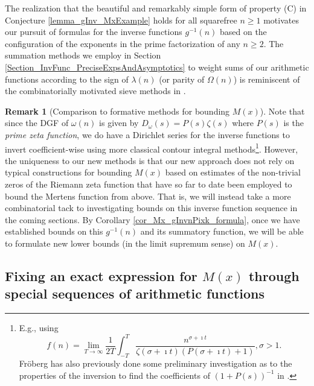 \documentclass[11pt,reqno,a4letter]{article}
\numberwithin{figure}{section}
\numberwithin{table}{section}
\theoremstyle{plain}
\numberwithin{theorem}{section}
\theoremstyle{definition}
\newtheorem{remark}[theorem]{Remark}
\begin{document}
The realization that the beautiful and remarkably simple form of property (C) 
in Conjecture \ref{lemma_gInv_MxExample} holds for all squarefree $n \geq 1$ 
motivates our pursuit of formulas for the inverse functions $g^{-1}(n)$ based on the configuration of the 
exponents in the prime factorization of any $n \geq 2$. 
The summation methods we employ in Section \ref{Section_InvFunc_PreciseExpsAndAsymptotics} 
to weight sums of our arithmetic functions according to the sign of 
$\lambda(n)$ (or parity of $\Omega(n)$) is reminiscent of the combinatorially motivated sieve methods in 
\cite[\S 17]{OPERADECRIBERO}. 

\begin{remark}[Comparison to formative methods for bounding $M(x)$]
Note that since the DGF of $\omega(n)$ is given by 
$D_{\omega}(s) = P(s) \zeta(s)$ where $P(s)$ is the \emph{prime zeta function}, we do have a 
Dirichlet series for the inverse functions to invert coefficient-wise using more classical 
contour integral methods\footnote{
E.g., using \cite[\S 11]{APOSTOLANUMT} 
\[
f(n) = \lim_{T \rightarrow \infty} \frac{1}{2T} \int_{-T}^{T} 
     \frac{n^{\sigma+\imath t}}{\zeta(\sigma+\imath t)(P(\sigma+\imath t) + 1)}, \sigma > 1. 
\]
Fr\"oberg has also previously done some preliminary investigation as to the properties of the 
inversion to find the coefficients of $(1+P(s))^{-1}$ in \cite{FROBERG-1968}. 
}. 
However, the uniqueness to our new methods is that our new approach does not rely on typical constructions for 
bounding $M(x)$ based on estimates of the non-trivial zeros of the Riemann zeta function that have so far 
to date been employed to bound the Mertens function from above. 
That is, we will instead take a more combinatorial tack to investigating bounds on this inverse function 
sequence in the coming sections. By Corollary \ref{cor_Mx_gInvnPixk_formula}, 
once we have established bounds on this $g^{-1}(n)$ and its summatory function, we will be able to 
formulate new lower bounds (in the limit supremum sense) on $M(x)$. 
\end{remark} 

\subsection{Fixing an exact expression for $M(x)$ through special sequences of arithmetic functions} 
\end{document}
